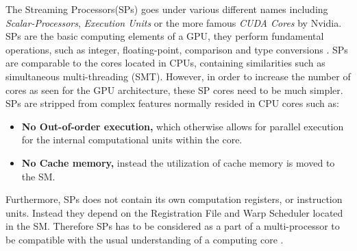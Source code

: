 The Streaming Processors(SPs) goes under various different names including \textit{Scalar-Processors}, \textit{Execution Units} or the more famous \textit{CUDA Cores} by Nvidia.
SPs are the basic computing elements of a GPU, they perform fundamental operations, such as integer, floating-point, comparison and type conversions \cite{Li2016}.
SPs are comparable to the cores located in CPUs, containing similarities such as simultaneous multi-threading (SMT).
However, in order to increase the number of cores as seen for the GPU architecture, these SP cores need to be much simpler.
SPs are stripped from complex features normally resided in CPU cores such as:

\begin{itemize}
	\item \textbf{No Out-of-order execution,} which otherwise allows for parallel execution for the internal computational units within the core. 
	\item \textbf{No Cache memory,} instead the utilization of cache memory is moved to the SM. 
\end{itemize}

Furthermore, SPs does not contain its own computation registers, or instruction units.
Instead they depend on the Registration File and Warp Scheduler located in the SM.
Therefore SPs has to be considered as a part of a multi-processor to be compatible with the usual understanding of a computing core \cite{Maitre2013}.

